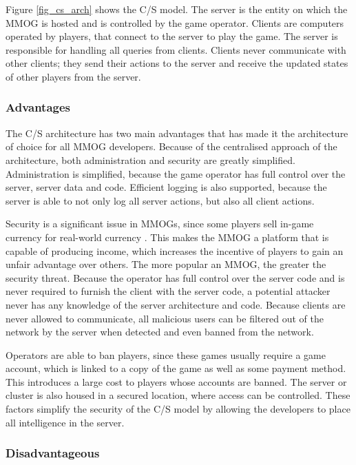 Figure \ref{fig_cs_arch} shows the C/S model. The server is the entity on which the MMOG is hosted and is controlled by the game operator. Clients are computers operated by players, that connect to the server to play the game. The server is responsible for handling all queries from clients. Clients never communicate with other clients; they send their actions to the server and receive the updated states of other players from the server.

\subsubsection{Advantages}

The C/S architecture has two main advantages that has made it the architecture of choice for all MMOG developers. Because of the centralised approach of the architecture, both administration and security are greatly simplified. Administration is simplified, because the game operator has full control over the server, server data and code. Efficient logging is also supported, because the server is able to not only log all server actions, but also all client actions.

Security is a significant issue in MMOGs, since some players sell in-game currency for real-world currency \cite{chinese_gold_farmer}. This makes the MMOG a platform that is capable of producing income, which increases the incentive of players to gain an unfair advantage over others. The more popular an MMOG, the greater the security threat. Because the operator has full control over the server code and is never required to furnish the
client with the server code, a potential attacker never has any knowledge of the server architecture and code. Because clients are never allowed to communicate, all malicious users can be filtered out of the network by the server when detected and even banned from the network.

Operators are able to ban players, since these games usually require a game account, which is linked to a copy of the game as well as some payment method. This introduces a large cost to players whose accounts are banned. The server or cluster is also housed in a secured location, where access can be controlled. These factors simplify the security of the C/S model by allowing the developers to place all intelligence in the server.

\subsubsection{Disadvantageous}

